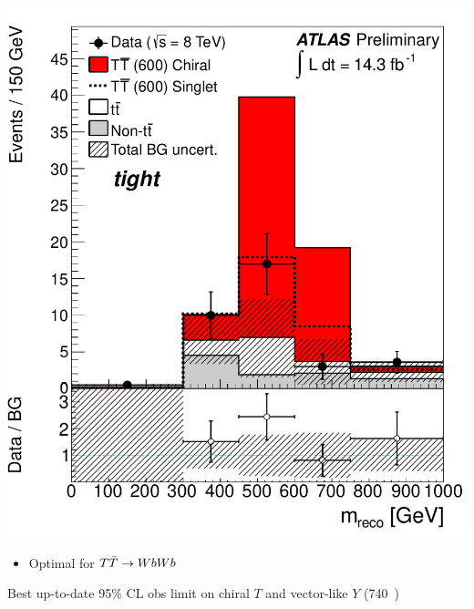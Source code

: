 \begin{frame}
\begin{minipage}{.2\textwidth}\centering
\includegraphics[width=1.\textwidth]{pics/VLQAna_WbX_1W_MWb_4_ELEMUON_cutflow1234567_NOMINAL.pdf}
\end{minipage}\begin{minipage}{.3\textwidth}\centering

\scriptsize

\begin{itemize}
\item Optimal for $\TTbar\to WbWb$
\end{itemize}

Best up-to-date 95\% CL obs limit on 
chiral $T$ and vector-like $Y$ (740~\gev)

\end{minipage}\begin{minipage}{.2\textwidth}\centering


\end{minipage}
\end{frame}
